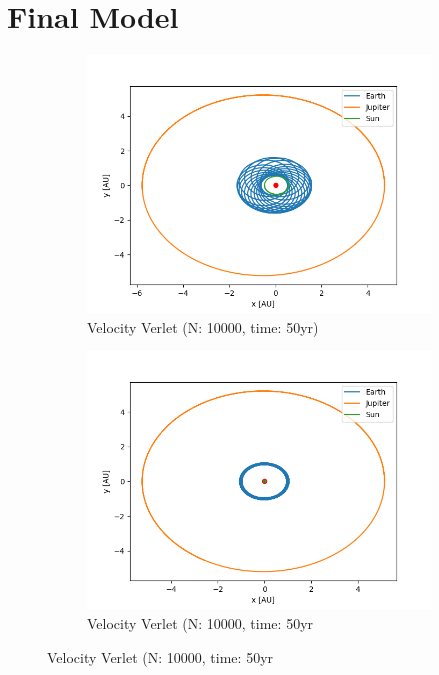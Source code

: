 \documentclass{article}
\begin{document}
\section*{Final Model}
\begin{figure}[H]
  \centering
  \begin{subfigure}{0.5\textwidth}
    \centering
    \includegraphics[width=1.0\textwidth]{plots/threebody0p001.png}
    \caption{Velocity Verlet (N: 10000, time: 50yr)}
  \end{subfigure}%
    \begin{subfigure}{0.5\textwidth}
    \centering
    \includegraphics[width=1.0\textwidth]{plots/threebody0p01.png}
    \caption{Velocity Verlet (N: 10000, time: 50yr}  
  \end{subfigure}
\end{figure}
\end{document}
